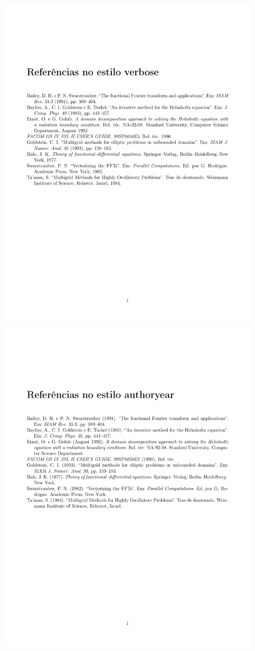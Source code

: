 \includegraphics[width=1\textwidth]{biblatex_style_samples/verbose} \\
\includegraphics[width=1\textwidth]{biblatex_style_samples/authoryear}
